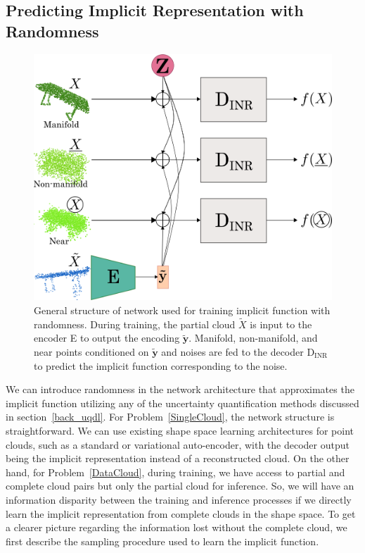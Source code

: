     \subsection{Predicting Implicit Representation with Randomness}
    \begin{figure}[htb]
      \begin{center}
      \includegraphics[width=\linewidth]{figures/inr_network.png}
      \end{center}
      \caption{General structure of network used for training implicit function with randomness. During training, the partial cloud $\tilde{X}$ is input to the encoder E to output the encoding $\mathbf{\tilde{y}}$. Manifold, non-manifold, and near points conditioned on $\mathbf{\tilde{y}}$ and noises are fed to the decoder D$_{\text{INR}}$ to predict the implicit function corresponding to the noise.}\label{fig:inr_net}
    \end{figure}
    We can introduce randomness in the network architecture that approximates the implicit function utilizing any of the uncertainty quantification methods discussed in section~\ref{back_uqdl}. For Problem~\ref{SingleCloud}, the network structure is straightforward. We can use existing shape space learning architectures for point clouds, such as a standard or variational auto-encoder, with the decoder output being the implicit representation instead of a reconstructed cloud. On the other hand, for Problem~\ref{DataCloud}, during training, we have access to partial and complete cloud pairs but only the partial cloud for inference. So, we will have an information disparity between the training and inference processes if we directly learn the implicit representation from complete clouds in the shape space. To get a clearer picture regarding the information lost without the complete cloud, we first describe the sampling procedure used to learn the implicit function.
    
